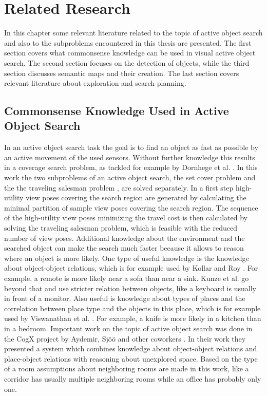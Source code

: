\chapter{Related Research}

In this chapter some relevant literature related to the topic of active object search and also to the subproblems encountered in this thesis are presented. The first section covers what commonsense knowledge can be used in visual active object search. The second section focuses on the detection of objects, while the third section discusses semantic maps and their creation. The last section covers relevant literature about exploration and search planning. 

\section{Commonsense Knowledge Used in Active Object Search }

In an active object search task the goal is to find an object as fast as possible by an active movement of the used sensors. Without further knowledge this results in a coverage search problem, as tackled for example by Dornhege et al. \cite{coverage}. In this work the two subproblems of an active object search, the set cover problem \cite{setCover} and the the traveling salesman problem \cite{TSM}, are solved separately. In a first step high-utility view poses covering the search region are generated by calculating the minimal partition of sample view poses covering the search region. The sequence of the high-utility view poses minimizing the travel cost is then calculated by solving the traveling salesman problem, which is feasible with the reduced number of view poses. Additional knowledge about the environment and the searched object can make the search much faster because it allows to reason where an object is more likely. One type of useful knowledge is the knowledge about object-object relations, which is for example used by Kollar and Roy \cite{objobj}. For example, a remote is more likely near a sofa than near a sink. Kunze et al. \cite{objobj2} go beyond that and use stricter relation between objects, like a keyboard is usually in front of a monitor. Also useful is knowledge about types of places and the correlation between place type and the objects in this place, which is for example used by Viswanathan et al. \cite{objroom}. For example, a knife is more likely in a kitchen than in a bedroom. Important work on the topic of active object search was done in the CogX project by Aydemir, Sjöö and other coworkers \cite{main_1}\cite{main}\cite{main_2}. In their work they presented a system which combines knowledge about object-object relations and place-object relations with reasoning about unexplored space. Based on the type of a room assumptions about neighboring rooms are made in this work, like a corridor has usually multiple neighboring rooms while an office has probably only one.

